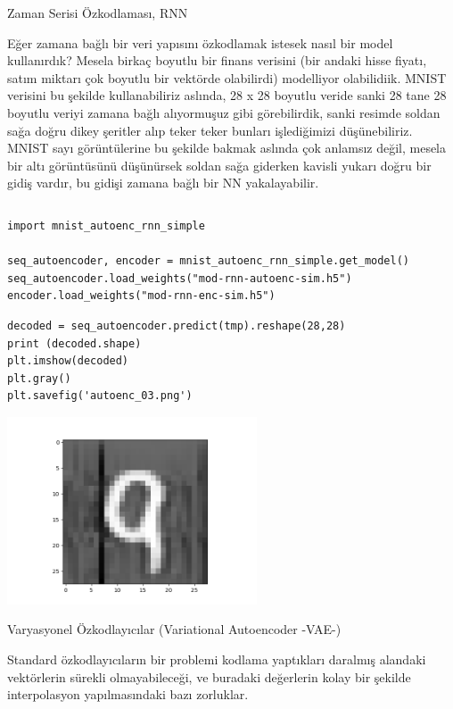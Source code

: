 \documentclass[12pt,fleqn]{article}\usepackage{../../common}
\begin{document}
Zaman Serisi Özkodlaması, RNN 

Eğer zamana bağlı bir veri yapısını özkodlamak istesek nasıl bir model
kullanırdık? Mesela birkaç boyutlu bir finans verisini (bir andaki hisse
fiyatı, satım miktarı çok boyutlu bir vektörde olabilirdi) modelliyor
olabilidiik. MNIST verisini bu şekilde kullanabiliriz aslında, 28 x 28
boyutlu veride sanki 28 tane 28 boyutlu veriyi zamana bağlı alıyormuşuz
gibi görebilirdik, sanki resimde soldan sağa doğru dikey şeritler alıp
teker teker bunları işlediğimizi düşünebiliriz. MNIST sayı görüntülerine bu
şekilde bakmak aslında çok anlamsız değil, mesela bir altı görüntüsünü
düşünürsek soldan sağa giderken kavisli yukarı doğru bir gidiş vardır, bu
gidişi zamana bağlı bir NN yakalayabilir. 

\inputminted[fontsize=\footnotesize]{python}{mnist_autoenc_rnn_simple.py}

\begin{verbatim}
import mnist_autoenc_rnn_simple

seq_autoencoder, encoder = mnist_autoenc_rnn_simple.get_model()
seq_autoencoder.load_weights("mod-rnn-autoenc-sim.h5")
encoder.load_weights("mod-rnn-enc-sim.h5")
\end{verbatim}

\begin{verbatim}
decoded = seq_autoencoder.predict(tmp).reshape(28,28)
print (decoded.shape)
plt.imshow(decoded)
plt.gray()
plt.savefig('autoenc_03.png')
\end{verbatim}

\includegraphics[width=20em]{autoenc_03.png}

Varyasyonel Özkodlayıcılar (Variational Autoencoder -VAE-)

Standard özkodlayıcıların bir problemi kodlama yaptıkları daralmış
alandaki vektörlerin sürekli olmayabileceği, ve buradaki değerlerin
kolay bir şekilde interpolasyon yapılmasındaki bazı zorluklar.
\end{document}
